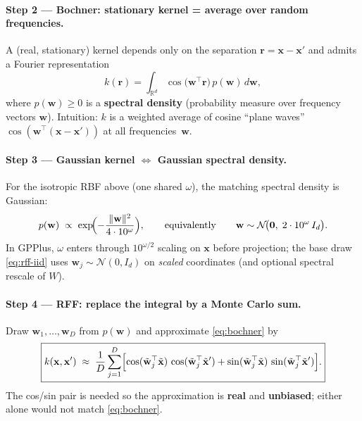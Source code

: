\documentclass[11pt]{article}
\begin{document}
\paragraph{Step 2 --- Bochner: stationary kernel = average over random frequencies.}
A (real, stationary) kernel depends only on the separation $\mathbf r=\mathbf x-\mathbf x'$ and admits a Fourier representation
\begin{equation}
  \label{eq:bochner}
  k(\mathbf r)
  = \int_{\mathbb{R}^d} \cos\!\bigl(\mathbf w^{\top}\mathbf r\bigr)\,p(\mathbf w)\,d\mathbf w,
\end{equation}
where $p(\mathbf w)\ge 0$ is a \textbf{spectral density} (probability measure over frequency vectors $\mathbf w$).
Intuition: $k$ is a weighted average of cosine ``plane waves'' $\cos(\mathbf w^{\top}(\mathbf x-\mathbf x'))$ at all frequencies~$\mathbf w$.

\paragraph{Step 3 --- Gaussian kernel $\Leftrightarrow$ Gaussian spectral density.}
For the isotropic RBF above (one shared $\omega$), the matching spectral density is Gaussian:
\begin{equation}
  \label{eq:rbf-spectral}
  p(\mathbf w)
  \;\propto\;
  \exp\!\Bigl(-\frac{\|\mathbf w\|^2}{4\cdot 10^{\omega}}\Bigr),
  \qquad\text{equivalently}\qquad
  \mathbf w \sim \mathcal N\!\bigl(\mathbf 0,\; 2\cdot 10^{\omega}\,I_d\bigr).
\end{equation}
In GPPlus, $\omega$ enters through $10^{\omega/2}$ scaling on $\mathbf x$ before projection; the base draw
\eqref{eq:rff-iid} uses $\mathbf w_j\sim\mathcal N(0,I_d)$ on \emph{scaled} coordinates (and optional spectral rescale of $W$).

\paragraph{Step 4 --- RFF: replace the integral by a Monte Carlo sum.}
Draw $\mathbf w_1,\ldots,\mathbf w_D$ from $p(\mathbf w)$ and approximate \eqref{eq:bochner} by
\begin{equation}
  \label{eq:rff-kernel-approx}
  \boxed{
  k(\mathbf x,\mathbf x')
  \;\approx\;
  \frac{1}{D}\sum_{j=1}^{D}
  \Bigl[
    \cos(\tilde{\mathbf w}_j^{\top}\tilde{\mathbf x})\,\cos(\tilde{\mathbf w}_j^{\top}\tilde{\mathbf x}')
    +
    \sin(\tilde{\mathbf w}_j^{\top}\tilde{\mathbf x})\,\sin(\tilde{\mathbf w}_j^{\top}\tilde{\mathbf x}')
  \Bigr].
  }
\end{equation}
The cos/sin pair is needed so the approximation is \textbf{real} and \textbf{unbiased}; either alone would not match \eqref{eq:bochner}.
\end{document}
